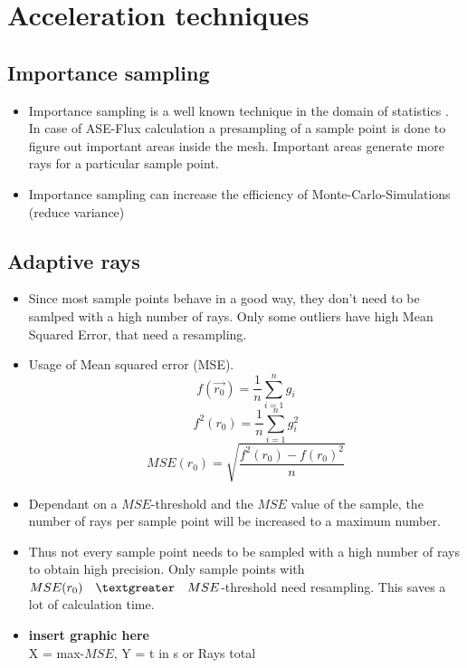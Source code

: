 \section{Acceleration techniques}

\subsection{Importance sampling}
\begin{itemize}
\item Importance sampling is a well known technique in the domain
  of statistics \cite{importanceSampling}. In case of ASE-Flux calculation a presampling of
  a sample point is done to figure out important areas
  inside the mesh. Important areas generate more rays for a
  particular sample point.
\item Importance sampling can increase the efficiency of Monte-Carlo-Simulations (reduce variance)
\end{itemize}

\subsection{Adaptive rays}
\begin{itemize}
\item Since most sample points behave in a good way, they don't need
  to be samlped with a high number of rays. Only some outliers have high Mean
  Squared Error, that need a resampling.
\item Usage of Mean squared error (MSE).
     \[f(\vec{r_0}) = \frac{1}{n} \sum_{i=1}^n g_i \]
     \[f^2(r_0) = \frac{1}{n} \sum_{i=1}^n g_i^2 \]
     \[MSE(r_0) = \sqrt{\frac{f^2(r_0) - f(r_0)^2}{n}}\]
\item Dependant on a $MSE$-threshold and the $MSE$ value
  of the sample, the number of rays per sample point 
  will be increased to a maximum number.
\item Thus not every sample point needs to be sampled
  with a high number of rays to obtain high precision.
  Only sample points with $MSE(r_0) \quad \textgreater \quad MSE$-threshold need
  resampling. This saves a lot of calculation time.
\item \textbf{insert graphic here}\\
  X = max-$MSE$, Y = t in s or Rays total
\end{itemize}
